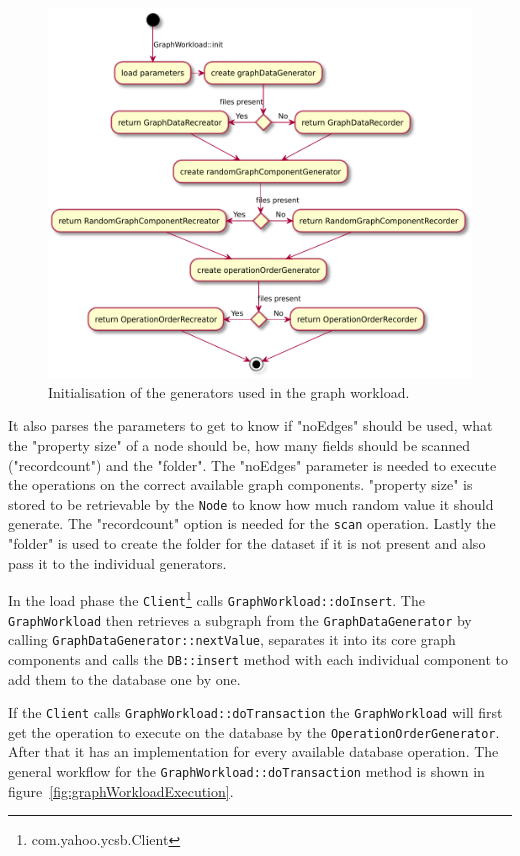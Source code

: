\begin{figure}[h!]
  \includegraphics[width=\textwidth]{images/extensions/GraphWorkload}
  \caption{Initialisation of the generators used in the graph workload.}
  \label{fig:graphWorkloadInit}
\end{figure}

It also parses the parameters to get to know if "noEdges" should be used,
what the "property size" of a node should be,
how many fields should be scanned ("recordcount") and the "folder".
The "noEdges" parameter is needed to execute the operations on the correct available graph components.
"property size" is stored to be retrievable by the \texttt{Node} to know how much random value it should generate.
The "recordcount" option is needed for the \texttt{scan} operation.
Lastly the "folder" is used to create the folder for the dataset if it is not present and also pass it to the individual generators.

In the load phase the \texttt{Client}\footnote{com.yahoo.ycsb.Client} calls \texttt{GraphWorkload::doInsert}.
The \texttt{GraphWorkload} then retrieves a subgraph from the \texttt{GraphDataGenerator} by calling \texttt{GraphDataGenerator::nextValue},
separates it into its core graph components and calls the \texttt{DB::insert} method with each individual component to add them to the database one by one.

If the \texttt{Client} calls \texttt{GraphWorkload::doTransaction} the \texttt{GraphWorkload} will first get the operation to execute on the database by the \texttt{OperationOrderGenerator}.
After that it has an implementation for every available database operation.
The general workflow for the \texttt{GraphWorkload::doTransaction} method is shown in figure~\ref{fig:graphWorkloadExecution}.

